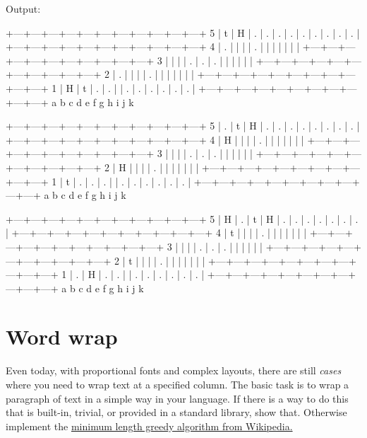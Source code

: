 \begin{wideverbatim}

Output:

   +---+---+---+---+---+---+---+---+---+---+---+
 5 | t | H | . | . | . | . | . | . | . | . | . |
   +---+---+---+---+---+---+---+---+---+---+---+
 4 | . |   |   |   | . |   |   |   |   |   |   |
   +---+---+---+---+---+---+---+---+---+---+---+
 3 |   |   |   | . | . | . |   |   |   |   |   |
   +---+---+---+---+---+---+---+---+---+---+---+
 2 | . |   |   |   | . |   |   |   |   |   |   |
   +---+---+---+---+---+---+---+---+---+---+---+
 1 | H | t | . | . |   | . | . | . | . | . | . |
   +---+---+---+---+---+---+---+---+---+---+---+
     a   b   c   d   e   f   g   h   i   j   k

   +---+---+---+---+---+---+---+---+---+---+---+
 5 | . | t | H | . | . | . | . | . | . | . | . |
   +---+---+---+---+---+---+---+---+---+---+---+
 4 | H |   |   |   | . |   |   |   |   |   |   |
   +---+---+---+---+---+---+---+---+---+---+---+
 3 |   |   |   | . | . | . |   |   |   |   |   |
   +---+---+---+---+---+---+---+---+---+---+---+
 2 | H |   |   |   | . |   |   |   |   |   |   |
   +---+---+---+---+---+---+---+---+---+---+---+
 1 | t | . | . | . |   | . | . | . | . | . | . |
   +---+---+---+---+---+---+---+---+---+---+---+
     a   b   c   d   e   f   g   h   i   j   k

   +---+---+---+---+---+---+---+---+---+---+---+
 5 | H | . | t | H | . | . | . | . | . | . | . |
   +---+---+---+---+---+---+---+---+---+---+---+
 4 | t |   |   |   | . |   |   |   |   |   |   |
   +---+---+---+---+---+---+---+---+---+---+---+
 3 |   |   |   | . | . | . |   |   |   |   |   |
   +---+---+---+---+---+---+---+---+---+---+---+
 2 | t |   |   |   | . |   |   |   |   |   |   |
   +---+---+---+---+---+---+---+---+---+---+---+
 1 | . | H | . | . |   | . | . | . | . | . | . |
   +---+---+---+---+---+---+---+---+---+---+---+
     a   b   c   d   e   f   g   h   i   j   k

\end{wideverbatim}

\pagebreak{}
\section*{Word wrap}

Even today, with proportional fonts and complex layouts, there are
still \emph{cases} where you need to wrap text at a specified column.
The basic task is to wrap a paragraph of text in a simple way in your
language. If there is a way to do this that is built-in, trivial, or
provided in a standard library, show that. Otherwise implement the
\href{http://en.wikipedia.org/wiki/Word\_wrap\#Minimum\_length}{minimum
  length greedy algorithm from Wikipedia.}

